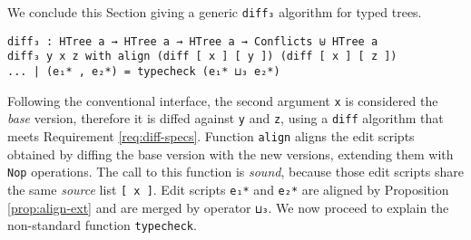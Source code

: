 \documentclass{sigplanconf}
\theoremstyle{plain}
\newtheorem{prop}{Proposition}
\begin{document}

        

	We conclude this Section giving a generic \texttt{diff₃}
        algorithm for typed trees.
\begin{verbatim}
diff₃ : HTree a → HTree a → HTree a → Conflicts ⊎ HTree a
diff₃ y x z with align (diff [ x ] [ y ]) (diff [ x ] [ z ])
... | (e₁* , e₂*) = typecheck (e₁* ⊔₃ e₂*)
\end{verbatim}
	Following the conventional interface, the second argument
        \texttt{x} is considered the \emph{base} version, therefore it
        is diffed against \texttt{y} and \texttt{z}, using a
        \texttt{diff} algorithm that meets Requirement
        \ref{req:diff-specs}.
        Function \texttt{align} aligns the edit scripts obtained by
        diffing the base version with the new versions, extending them
        with \texttt{Nop} operations.
        The call to this function is \emph{sound}, because those edit
        scripts share the same \emph{source} list \texttt{[ x ]}.
        Edit scripts \texttt{e₁*} and \texttt{e₂*} are aligned by
        Proposition \ref{prop:align-ext} and are merged by operator
        \texttt{⊔₃}.
        We now proceed to explain the non-standard function
        \texttt{typecheck}.
        
\end{document}
